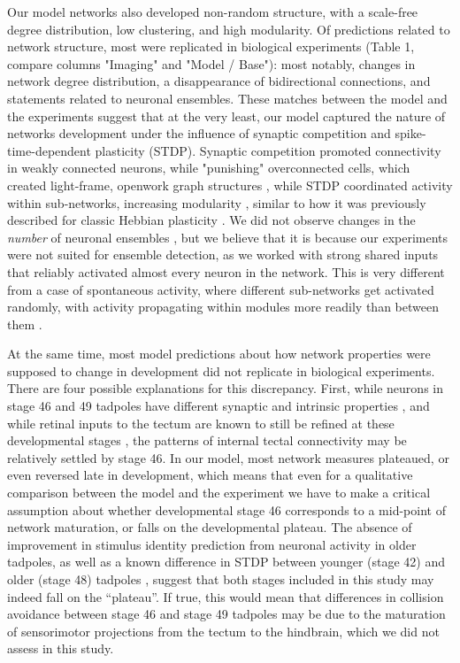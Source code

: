 \documentclass{article}
\begin{document}
Our model networks also developed non-random structure, with a scale-free degree distribution, low clustering, and high modularity. Of predictions related to network structure, most were replicated in biological experiments (Table 1, compare columns "Imaging" and "Model / Base"): most notably, changes in network degree distribution, a disappearance of bidirectional connections, and statements related to neuronal ensembles. These matches between the model and the experiments suggest that at the very least, our model captured the nature of networks development under the influence of synaptic competition and spike-time-dependent plasticity (STDP). Synaptic competition promoted connectivity in weakly connected neurons, while "punishing" overconnected cells, which created light-frame, openwork graph structures \citep{fiete2010chains}, while STDP coordinated activity within sub-networks, increasing modularity \citep{stam2010modular,litwin2014assemblies}, similar to how it was previously described for classic Hebbian plasticity \citep{triplett2018emergence,damicelli2018topomod}. We did not observe changes in the \textit{number} of neuronal ensembles \citep{avitan2017spontaneous,pietri2017emergence}, but we believe that it is because our experiments were not suited for ensemble detection, as we worked with strong shared inputs that reliably activated almost every neuron in the network. This is very different from a case of spontaneous activity, where different sub-networks get activated randomly, with activity propagating within modules more readily than between them \citep{avitan2017spontaneous}.

At the same time, most model predictions about how network properties were supposed to change in development did not replicate in biological experiments. There are four possible explanations for this discrepancy. First, while neurons in stage 46 and 49 tadpoles have different synaptic and intrinsic properties \citep{ciarleglio2015}, and while retinal inputs to the tectum are known to still be refined at these developmental stages \citep{tao2005refinement, munz2014hebbian}, the patterns of internal tectal connectivity may be relatively settled by stage 46. In our model, most network measures plateaued, or even reversed late in development, which means that even for a qualitative comparison between the model and the experiment we have to make a critical assumption about whether developmental stage 46 corresponds to a mid-point of network maturation, or falls on the developmental plateau. The absence of improvement in stimulus identity prediction from neuronal activity in older tadpoles, as well as a known difference in STDP between younger (stage 42) and older (stage 48) tadpoles \citep{richards2010stdp,tsui2010developmental}, suggest that both stages included in this study may indeed fall on the “plateau”. If true, this would mean that differences in collision avoidance between stage 46 and stage 49 tadpoles \citep{dong2009} may be due to the maturation of sensorimotor projections from the tectum to the hindbrain, which we did not assess in this study.
\end{document}
